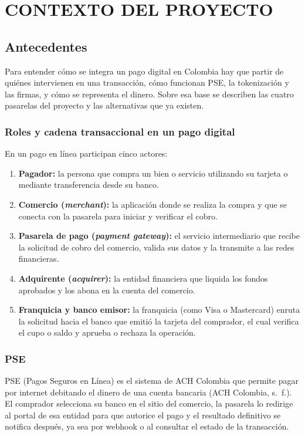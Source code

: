 \setcounter{subsection}{0}
\section{CONTEXTO DEL PROYECTO}
\sloppy

\subsection{Antecedentes}
Para entender cómo se integra un pago digital en Colombia hay que partir de quiénes intervienen en una transacción, cómo funcionan PSE, la tokenización y las firmas, y cómo se representa el dinero. Sobre esa base se describen las cuatro pasarelas del proyecto y las alternativas que ya existen.

\subsubsection{Roles y cadena transaccional en un pago digital}
En un pago en línea participan cinco actores:
\begin{enumerate}
    \item \textbf{Pagador:} la persona que compra un bien o servicio utilizando su tarjeta o mediante transferencia desde su banco.
    \item \textbf{Comercio (\textit{merchant}):} la aplicación donde se realiza la compra y que se conecta con la pasarela para iniciar y verificar el cobro.
    \item \textbf{Pasarela de pago (\textit{payment gateway}):} el servicio intermediario que recibe la solicitud de cobro del comercio, valida sus datos y la transmite a las redes financieras.
    \item \textbf{Adquirente (\textit{acquirer}):} la entidad financiera que liquida los fondos aprobados y los abona en la cuenta del comercio.
    \item \textbf{Franquicia y banco emisor:} la franquicia (como Visa o Mastercard) enruta la solicitud hacia el banco que emitió la tarjeta del comprador, el cual verifica el cupo o saldo y aprueba o rechaza la operación.
\end{enumerate}

\subsubsection{PSE}
PSE (Pagos Seguros en Línea) es el sistema de ACH Colombia que permite pagar por internet debitando el dinero de una cuenta bancaria (ACH Colombia, s.~f.). El comprador selecciona su banco en el sitio del comercio, la pasarela lo redirige al portal de esa entidad para que autorice el pago y el resultado definitivo se notifica después, ya sea por webhook o al consultar el estado de la transacción.

